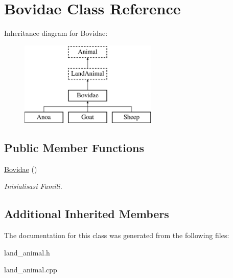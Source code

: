 \hypertarget{class_bovidae}{}\section{Bovidae Class Reference}
\label{class_bovidae}
Inheritance diagram for Bovidae\+:\begin{figure}[H]
\begin{center}
\leavevmode
\includegraphics[height=4.000000cm]{class_bovidae}
\end{center}
\end{figure}
\subsection*{Public Member Functions}
\begin{DoxyCompactItemize}
\item 
\hyperlink{class_bovidae_aaf97900f7eaef28ee3ff7304d68b3f7c}{Bovidae} ()\hypertarget{class_bovidae_aaf97900f7eaef28ee3ff7304d68b3f7c}{}\label{class_bovidae_aaf97900f7eaef28ee3ff7304d68b3f7c}

\begin{DoxyCompactList}\small\item\em Inisialisasi Famili. \end{DoxyCompactList}\end{DoxyCompactItemize}
\subsection*{Additional Inherited Members}


The documentation for this class was generated from the following files\+:\begin{DoxyCompactItemize}
\item 
land\+\_\+animal.\+h\item 
land\+\_\+animal.\+cpp\end{DoxyCompactItemize}
